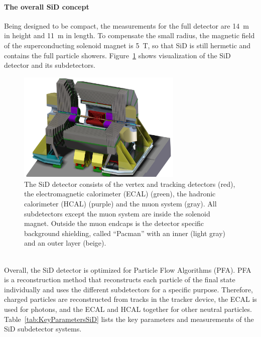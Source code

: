 \paragraph{The overall SiD concept}
Being designed to be compact, the measurements for the full detector are \SI{14}{m} in height and \SI{11}{m} in length.
To compensate the small radius, the magnetic field of the superconducting solenoid magnet is \SI{5}{T}, so that SiD is still hermetic and contains the full particle showers.
Figure~\ref{fig:SiD} shows visualization of the SiD detector and its subdetectors.
\begin{figure}
\centering
\includegraphics[width=0.7\textwidth]{Figures/SiD_new.jpg}
\caption[Visualization of the SiD detector]{The SiD detector consists of the vertex and tracking detectors (red), the electromagnetic calorimeter (ECAL) (green), the hadronic calorimeter (HCAL) (purple) and the muon system (gray).
All subdetectors except the muon system are inside the solenoid magnet.
Outside the muon endcaps is the detector specific background shielding, called ``Pacman'' with an inner (light gray) and an outer layer (beige).~\cite{SiD_Geo}}
\label{fig:SiD}
\end{figure}
\\Overall, the SiD detector is optimized for Particle Flow Algorithms (PFA).
PFA is a reconstruction method that reconstructs each particle of the final state individually and uses the different subdetectors for a specific purpose.
Therefore, charged particles are reconstructed from tracks in the tracker device, the ECAL is used for photons, and the ECAL and HCAL together for other neutral particles.~\cite{PFA}
Table~\ref{tab:KeyParametersSiD} lists the key parameters and measurements of the SiD subdetector systems.\\
